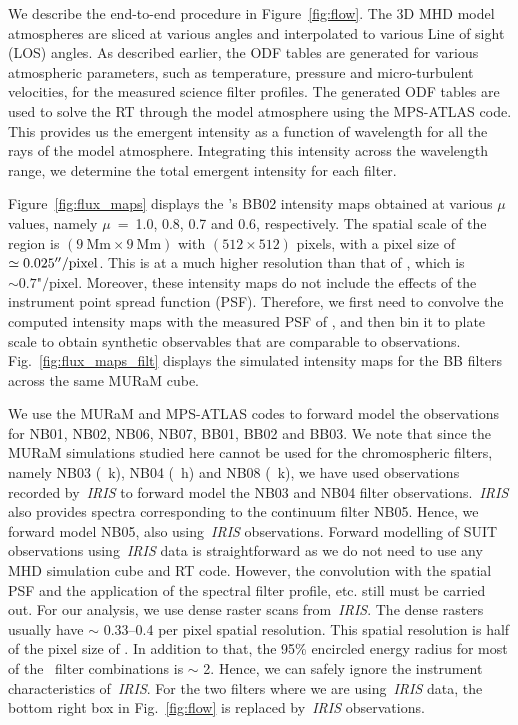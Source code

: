 We describe the end-to-end procedure in Figure~\ref{fig:flow}. The 3D MHD model atmospheres are sliced at various angles and interpolated to various Line of sight (LOS) angles. As described earlier, the ODF tables are generated for various atmospheric parameters, such as temperature, pressure and micro-turbulent velocities, for the measured science filter profiles. The generated ODF tables are used to solve the RT through the model atmosphere using the MPS-ATLAS code. This provides us the emergent intensity as a function of wavelength for all the rays of the model atmosphere. Integrating this intensity across the wavelength range, we determine the total emergent intensity for each filter.

Figure~\ref{fig:flux_maps} displays the {\suit}'s BB02 intensity maps obtained at various $\mu$ values, namely $\mu$~=~1.0, 0.8, 0.7 and 0.6, respectively. The spatial scale of the region is $(9~\textrm{Mm}\times9~\textrm{Mm})$ with $(512\times512)$ pixels, with a pixel size of $\simeq 0.025{\hbox{$^{\prime\prime}$}}/\textrm{pixel}$. This is at a much higher resolution than that of {\suit}, which is $\sim \textrm{0.7"/pixel}$. Moreover, these intensity maps do not include the effects of the instrument point spread function (PSF). Therefore,  we first need to convolve the computed intensity maps with the measured PSF of {\suit}, and then bin it to {\suit} plate scale to obtain synthetic observables that are comparable to {\suit} observations. Fig.~\ref{fig:flux_maps_filt} displays the simulated intensity maps for the {\suit} BB filters across the same MURaM cube.

We use the MURaM and MPS-ATLAS codes to forward model the observations for NB01, NB02, NB06, NB07, BB01, BB02 and BB03. We note that since the MURaM simulations studied here cannot be used for the chromospheric filters, namely NB03 (~k), NB04 (~h) and NB08 (~k), we have used observations recorded by~{\it IRIS} to forward model the NB03 and NB04 filter observations.~{\it IRIS} also provides spectra corresponding to the continuum filter NB05. Hence, we forward model NB05, also using~{\it IRIS} observations. Forward modelling of SUIT observations using~{\it IRIS} data is straightforward as we do not need to use any MHD simulation cube and RT code. However, the convolution with the spatial PSF and the application of the spectral filter profile, etc. still must be carried out. For our analysis, we use dense raster scans from~{\it IRIS}. The dense rasters usually have $\sim$ 0.33{--}0.4 \arcsec per pixel spatial resolution. This spatial resolution is half of the pixel size of \suit. In addition to that, the 95\% encircled energy radius for most of the \suit~filter combinations is $\sim$ 2\arcsec. Hence, we can safely ignore the instrument characteristics of~{\it IRIS}. For the two filters where we are using~{\it IRIS} data, the bottom right box in Fig.~\ref{fig:flow} is replaced by~{\it IRIS} observations.

